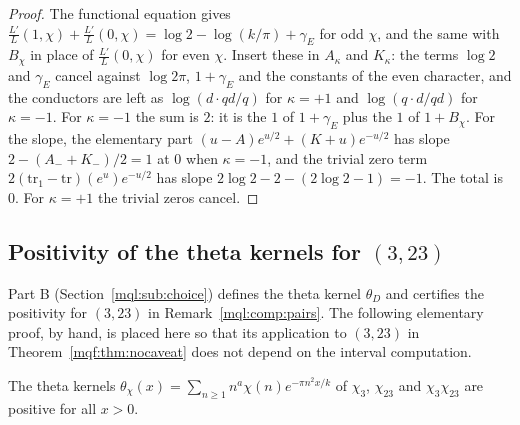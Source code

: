 \begin{proof}
The functional equation gives $\frac{L'}L(1,\chi)+\frac{L'}L(0,\chi)=\log2-\log(k/\pi)+\gamma_E$ for odd $\chi$, and the same with $B_\chi$ in place of $\frac{L'}L(0,\chi)$ for even $\chi$. Insert these in $A_\kappa$ and $K_\kappa$: the terms $\log2$ and $\gamma_E$ cancel against $\log2\pi$, $1+\gamma_E$ and the constants of the even character, and the conductors are left as $\log(d\cdot qd/q)$ for $\kappa=+1$ and $\log(q\cdot d/qd)$ for $\kappa=-1$. For $\kappa=-1$ the sum is $2$: it is the $1$ of $1+\gamma_E$ plus the $1$ of $1+B_\chi$. For the slope, the elementary part $(u-A)e^{u/2}+(K+u)e^{-u/2}$ has slope $2-(A_-+K_-)/2=1$ at $0$ when $\kappa=-1$, and the trivial zero term $2(\mathrm{tr}_1-\mathrm{tr})(e^u)e^{-u/2}$ has slope $2\log2-2-(2\log2-1)=-1$. The total is $0$. For $\kappa=+1$ the trivial zeros cancel.
\end{proof}

\subsection{Positivity of the theta kernels for $(3,23)$}\label{mqf:sub:kernels}

Part B (Section~\ref{mql:sub:choice}) defines the theta kernel $\theta_D$ and certifies the positivity for $(3,23)$ in Remark~\ref{mql:comp:pairs}. The following elementary proof, by hand, is placed here so that its application to $(3,23)$ in Theorem~\ref{mqf:thm:nocaveat} does not depend on the interval computation.

\begin{proposition}\label{mqf:prop:kernels}
The theta kernels $\theta_\chi(x)=\sum_{n\ge1}n^a\chi(n)e^{-\pi n^2x/k}$ of $\chi_3$, $\chi_{23}$ and $\chi_3\chi_{23}$ are positive for all $x>0$.
\end{proposition}

